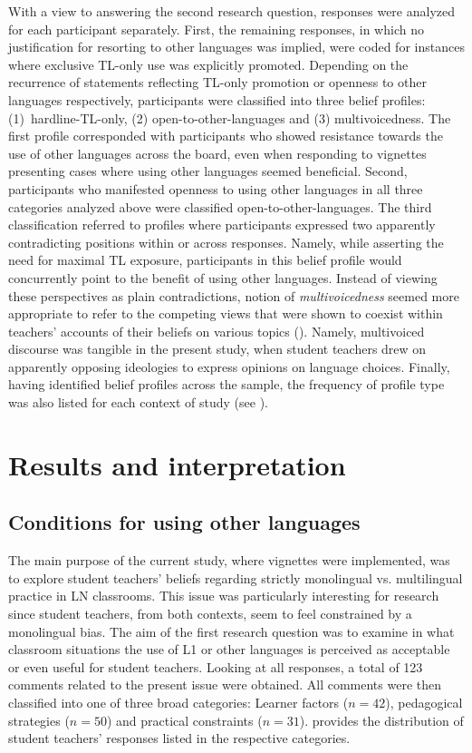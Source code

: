 \documentclass[output=paper]{../langscibook}
\begin{document}
With a view to answering the second research question, responses were analyzed for each participant separately. First, the remaining responses, in which no justification for resorting to other languages was implied, were coded for instances where exclusive TL-only use was explicitly promoted. Depending on the recurrence of statements reflecting TL-only promotion or openness to other languages respectively, participants were classified into three belief profiles: (1)~hard\-line-TL-only, (2) open-to-other-languages and (3) multivoicedness. The first profile corresponded with participants who showed resistance towards the use of other languages across the board, even when responding to vignettes presenting cases where using other languages seemed beneficial. Second, participants who manifested openness to using other languages in all three categories analyzed above were classified open-to-other-languages. The third classification referred to profiles where participants expressed two apparently contradicting positions within or across responses. Namely, while asserting the need for maximal TL exposure, participants in this belief profile would concurrently point to the benefit of using other languages. Instead of viewing these perspectives as plain contradictions,  notion of \emph{multivoicedness} seemed more appropriate to refer to the competing views that were shown to coexist within teachers’ accounts of their beliefs on various topics (\citealt{BallWarshauerFreedman2004}). Namely, multivoiced discourse was tangible in the present study, when student teachers drew on apparently opposing ideologies to express opinions on language choices. Finally, having identified belief profiles across the sample, the frequency of profile type was also listed for each context of study (see ).


\section{Results and interpretation}


\subsection{Conditions for using other languages}



The main purpose of the current study, where vignettes were implemented, was to explore student teachers’ beliefs regarding strictly monolingual vs. multilingual practice in LN classrooms. This issue was particularly interesting for research since student teachers, from both contexts, seem to feel constrained by a monolingual bias. The aim of the first research question was to examine in what classroom situations the use of L1 or other languages is perceived as acceptable or even useful for student teachers. Looking at all responses, a total of 123 comments related to the present issue were obtained. All comments were then classified into one of three broad categories: Learner factors ($n=42$), pedagogical strategies ($n=50$) and practical constraints ($n=31$).  provides the distribution of student teachers’ responses listed in the respective categories.
\end{document}
